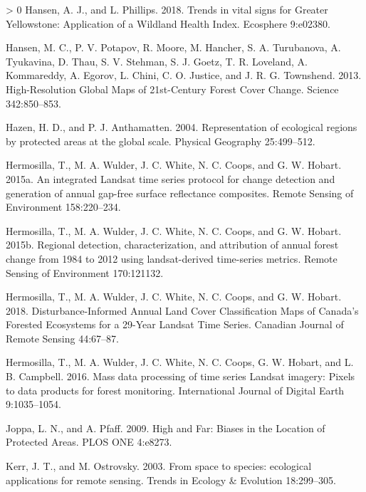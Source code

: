 \documentclass[11pt]{article}
\newlength{\cslhangindent}
\newenvironment{CSLReferences}[3] %
 {%
  \setlength{\parindent}{0pt}
  \ifodd #1 \everypar{\setlength{\hangindent}{\cslhangindent}}\ignorespaces\fi
  \ifnum #2 > 0
  \setlength{\parskip}{#2\baselineskip}
  \fi
 }%
 {}
\begin{document}
\begin{CSLReferences}{1}{0}
\leavevmode\hypertarget{ref-hansenTrendsVitalSigns2018}{}%
Hansen, A. J., and L. Phillips. 2018. Trends in vital signs for Greater
Yellowstone: Application of a Wildland Health Index. Ecosphere 9:e02380.

\leavevmode\hypertarget{ref-hansenHighResolutionGlobalMaps2013}{}%
Hansen, M. C., P. V. Potapov, R. Moore, M. Hancher, S. A. Turubanova, A.
Tyukavina, D. Thau, S. V. Stehman, S. J. Goetz, T. R. Loveland, A.
Kommareddy, A. Egorov, L. Chini, C. O. Justice, and J. R. G. Townshend.
2013. High-Resolution Global Maps of 21st-Century Forest Cover Change.
Science 342:850--853.

\leavevmode\hypertarget{ref-hazen2004}{}%
Hazen, H. D., and P. J. Anthamatten. 2004. Representation of ecological
regions by protected areas at the global scale. Physical Geography
25:499--512.

\leavevmode\hypertarget{ref-hermosillaIntegratedLandsatTime2015}{}%
Hermosilla, T., M. A. Wulder, J. C. White, N. C. Coops, and G. W.
Hobart. 2015a. An integrated Landsat time series protocol for change
detection and generation of annual gap-free surface reflectance
composites. Remote Sensing of Environment 158:220--234.

\leavevmode\hypertarget{ref-hermosilla2015}{}%
Hermosilla, T., M. A. Wulder, J. C. White, N. C. Coops, and G. W.
Hobart. 2015b. Regional detection, characterization, and attribution of
annual forest change from 1984 to 2012 using landsat-derived time-series
metrics. Remote Sensing of Environment 170:121132.

\leavevmode\hypertarget{ref-hermosillaDisturbanceInformedAnnualLand2018}{}%
Hermosilla, T., M. A. Wulder, J. C. White, N. C. Coops, and G. W.
Hobart. 2018. Disturbance-Informed Annual Land Cover Classification Maps
of Canada's Forested Ecosystems for a 29-Year Landsat Time Series.
Canadian Journal of Remote Sensing 44:67--87.

\leavevmode\hypertarget{ref-hermosillaMassDataProcessing2016}{}%
Hermosilla, T., M. A. Wulder, J. C. White, N. C. Coops, G. W. Hobart,
and L. B. Campbell. 2016. Mass data processing of time series Landsat
imagery: Pixels to data products for forest monitoring. International
Journal of Digital Earth 9:1035--1054.

\leavevmode\hypertarget{ref-joppa2009}{}%
Joppa, L. N., and A. Pfaff. 2009. High and Far: Biases in the Location
of Protected Areas. PLOS ONE 4:e8273.

\leavevmode\hypertarget{ref-kerr2003}{}%
Kerr, J. T., and M. Ostrovsky. 2003. From space to species: ecological
applications for remote sensing. Trends in Ecology \& Evolution
18:299--305.


\end{CSLReferences}
\end{document}
